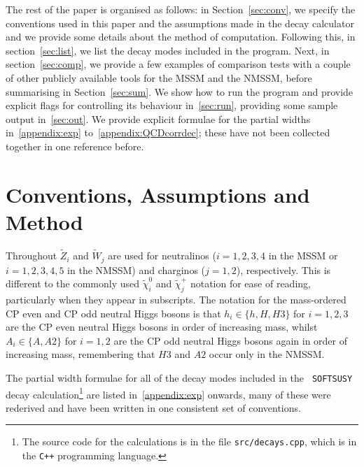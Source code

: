 \documentclass[final,3p,times,pdflatex]{elsarticle}
\def\code#1{{\tt #1}}
\begin{document}
The rest of the paper is organised as follows: in Section~\ref{sec:conv}, we 
specify the conventions used in this paper and the assumptions made in the
decay calculator and we provide some details about the method of computation. Following this, in section~\ref{sec:list}, we list the decay modes included in the program. Next, in section~\ref{sec:comp}, 
we provide a few examples of comparison tests 
with a couple of other publicly available tools for the MSSM and the NMSSM,
before summarising in Section~\ref{sec:sum}. We show how to run the program and
provide explicit flags for controlling its behaviour in~\ref{sec:run}, providing some sample output in~\ref{sec:out}. 
We provide explicit formulae for
the partial widths in~\ref{appendix:exp} to~\ref{appendix:QCDcorrdec}; these have not been collected
together in one reference before. 

\section{Conventions, Assumptions and Method \label{sec:conv}}

Throughout $\tilde{Z}_i$ and $\tilde{W}_j$ are used for neutralinos
($i=1,2,3,4$ in the MSSM or $i=1,2,3,4,5$ in the NMSSM) and charginos
($j=1,2$), respectively. This  is different to the commonly used
$\tilde{\chi}_{i}^{0}$ and $\tilde{\chi}_{j}^+$ notation for ease of reading, particularly
when they appear in subscripts. The notation for the mass-ordered CP even and
CP odd neutral Higgs bosons is that $h_i \in \{h, H, H3\}$ for $i=1,2,3$ are the CP even neutral Higgs
bosons in order of increasing mass, whilst $A_i \in \{A, A2\}$ for $i=1,2$ are the CP odd neutral
Higgs bosons again in order of increasing mass, remembering that $H3$ and $A2$
occur only in the NMSSM. 

The partial width formulae for all of the decay modes included in the {\tt
  SOFTSUSY} decay calculation\footnote{The source code for the calculations
  is in the file
  \code{src/decays.cpp}, which is in the \code{C++} programming language.} are
listed in~\ref{appendix:exp} 
onwards, many of these were rederived and have been written in one consistent
set of conventions. 
\end{document}
